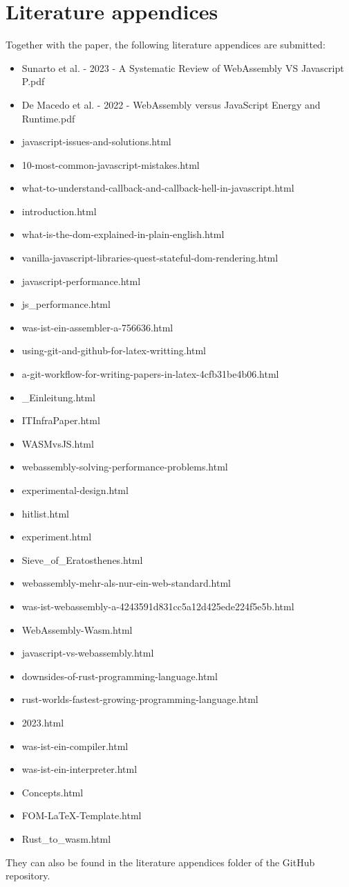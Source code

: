 \section{Literature appendices}
Together with the paper, the following literature appendices are submitted:

\begin{itemize}
    \item Sunarto et al. - 2023 - A Systematic Review of WebAssembly VS Javascript P.pdf
    \item De Macedo et al. - 2022 - WebAssembly versus JavaScript Energy and Runtime.pdf
    \item javascript-issues-and-solutions.html
    \item 10-most-common-javascript-mistakes.html
    \item what-to-understand-callback-and-callback-hell-in-javascript.html
    \item introduction.html
    \item what-is-the-dom-explained-in-plain-english.html
    \item vanilla-javascript-libraries-quest-stateful-dom-rendering.html
    \item javascript-performance.html
    \item js\_performance.html
    \item was-ist-ein-assembler-a-756636.html
    \item using-git-and-github-for-latex-writting.html
    \item a-git-workflow-for-writing-papers-in-latex-4cfb31be4b06.html
    \item \_Einleitung.html
    \item ITInfraPaper.html
    \item WASMvsJS.html
    \item webassembly-solving-performance-problems.html
    \item experimental-design.html
    \item hitlist.html
    \item experiment.html
    \item Sieve\_of\_Eratosthenes.html
    \item webassembly-mehr-als-nur-ein-web-standard.html
    \item was-ist-webassembly-a-4243591d831cc5a12d425ede224f5e5b.html
    \item WebAssembly-Wasm.html
    \item javascript-vs-webassembly.html
    \item downsides-of-rust-programming-language.html
    \item rust-worlds-fastest-growing-programming-language.html
    \item 2023.html
    \item was-ist-ein-compiler.html
    \item was-ist-ein-interpreter.html
    \item Concepts.html
    \item FOM-LaTeX-Template.html
    \item Rust\_to\_wasm.html
\end{itemize}
They can also be found in the literature appendices folder of the GitHub repository.

